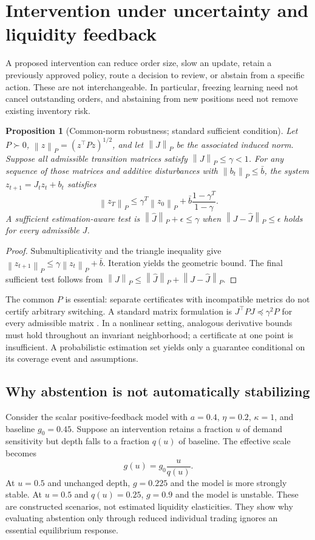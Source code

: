 \documentclass[11pt,a4paper]{article}
\newtheorem{proposition}[theorem]{Proposition}
\theoremstyle{definition}
\theoremstyle{remark}
\newcommand{\norm}[1]{\left\lVert #1\right\rVert}
\begin{document}
\section{Intervention under uncertainty and liquidity feedback}
\label{sec:intervention}
A proposed intervention can reduce order size, slow an update, retain a previously approved policy, route a decision to review, or abstain from a specific action. These are not interchangeable. In particular, freezing learning need not cancel outstanding orders, and abstaining from new positions need not remove existing inventory risk.

\begin{proposition}[Common-norm robustness; standard sufficient condition]
\label{prop:robust}
Let $P\succ0$, $\norm{z}_P=(z^\top Pz)^{1/2}$, and let $\norm{J}_P$ be the associated induced norm. Suppose all admissible transition matrices satisfy $\norm{J}_P\leq\gamma<1$. For any sequence of those matrices and additive disturbances with $\norm{b_t}_P\leq\bar b$, the system $z_{t+1}=J_tz_t+b_t$ satisfies
\begin{equation}
 \norm{z_T}_P\leq\gamma^T\norm{z_0}_P+
 \bar b\frac{1-\gamma^T}{1-\gamma}.
 \label{eq:robustbound}
\end{equation}
A sufficient estimation-aware test is $\norm{\widehat J}_P+\epsilon\leq\gamma$ when $\norm{J-\widehat J}_P\leq\epsilon$ holds for every admissible $J$.
\end{proposition}
\begin{proof}
Submultiplicativity and the triangle inequality give $\norm{z_{t+1}}_P\leq\gamma\norm{z_t}_P+\bar b$. Iteration yields the geometric bound. The final sufficient test follows from $\norm{J}_P\leq\norm{\widehat J}_P+\norm{J-\widehat J}_P$.
\end{proof}
The common $P$ is essential: separate certificates with incompatible metrics do not certify arbitrary switching. A standard matrix formulation is $J^\top PJ\preceq\gamma^2P$ for every admissible matrix \citep{boyd1994}. In a nonlinear setting, analogous derivative bounds must hold throughout an invariant neighborhood; a certificate at one point is insufficient. A probabilistic estimation set yields only a guarantee conditional on its coverage event and assumptions.

\subsection{Why abstention is not automatically stabilizing}
Consider the scalar positive-feedback model with $a=0.4$, $\eta=0.2$, $\kappa=1$, and baseline $g_0=0.45$. Suppose an intervention retains a fraction $u$ of demand sensitivity but depth falls to a fraction $q(u)$ of baseline. The effective scale becomes
\begin{equation}
 g(u)=g_0\frac{u}{q(u)}.
 \label{eq:gatedepth}
\end{equation}
At $u=0.5$ and unchanged depth, $g=0.225$ and the model is more strongly stable. At $u=0.5$ and $q(u)=0.25$, $g=0.9$ and the model is unstable. These are constructed scenarios, not estimated liquidity elasticities. They show why evaluating abstention only through reduced individual trading ignores an essential equilibrium response.
\end{document}
